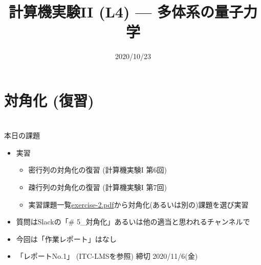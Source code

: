 \documentclass[10pt,dvipdfmx]{beamer}
\title{計算機実験II (L4) --- 多体系の量子力学}
\date{2020/10/23}
\begin{document}
\begin{frame}
  \titlepage
  \tableofcontents
\end{frame}



\section{対角化 (復習)}






\section{}
\begin{frame}[t]{本日の課題}
  \begin{itemize}
  \item 実習
    \begin{itemize}
    \item 密行列の対角化の復習 (計算機実験I 第6回)
    \item 疎行列の対角化の復習 (計算機実験I 第7回)
    \item 実習課題一覧\href{https://github.com/todo-group/ComputerExperiments/releases/tag/2020a-computer2}{exercise-2.pdf}から対角化(あるいは別の)課題を選び実習
    \end{itemize}
  \item 質問はSlackの「\# 5\_対角化」あるいは他の適当と思われるチャンネルで
  \item 今回は「作業レポート」はなし
  \item 「レポートNo.1」 (ITC-LMSを参照) 締切 2020/11/6(金)
  \end{itemize}
\end{frame}
\end{document}
